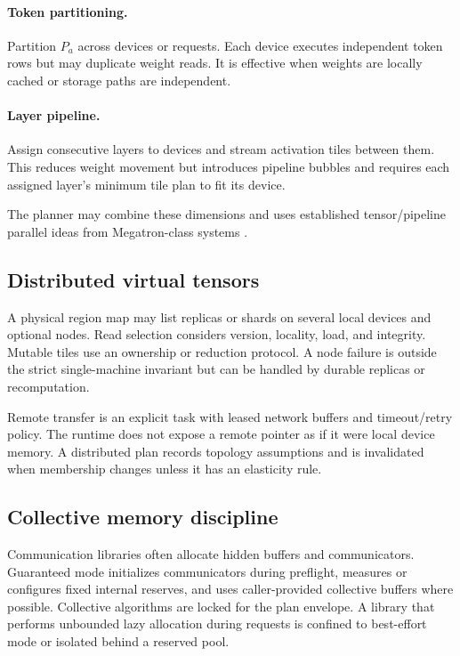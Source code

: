 \paragraph{Token partitioning.}
Partition $P_a$ across devices or requests. Each device executes independent token rows but may duplicate weight reads. It is effective when weights are locally cached or storage paths are independent.

\paragraph{Layer pipeline.}
Assign consecutive layers to devices and stream activation tiles between them. This reduces weight movement but introduces pipeline bubbles and requires each assigned layer's minimum tile plan to fit its device.

The planner may combine these dimensions and uses established tensor/pipeline parallel ideas from Megatron-class systems \cite{shoeybi2019megatron,narayanan2021efficient}.

\subsection{Distributed virtual tensors}

A physical region map may list replicas or shards on several local devices and optional nodes. Read selection considers version, locality, load, and integrity. Mutable tiles use an ownership or reduction protocol. A node failure is outside the strict single-machine invariant but can be handled by durable replicas or recomputation.

Remote transfer is an explicit task with leased network buffers and timeout/retry policy. The runtime does not expose a remote pointer as if it were local device memory. A distributed plan records topology assumptions and is invalidated when membership changes unless it has an elasticity rule.

\subsection{Collective memory discipline}

Communication libraries often allocate hidden buffers and communicators. Guaranteed mode initializes communicators during preflight, measures or configures fixed internal reserves, and uses caller-provided collective buffers where possible. Collective algorithms are locked for the plan envelope. A library that performs unbounded lazy allocation during requests is confined to best-effort mode or isolated behind a reserved pool.


